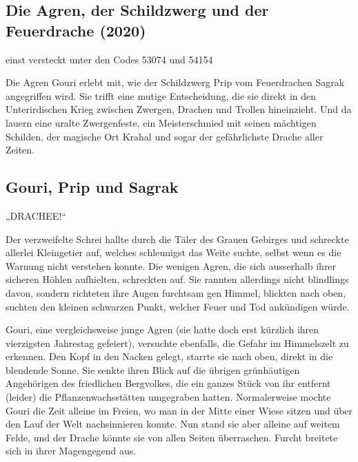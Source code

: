 \begin{chapterbox}
    \chapter{Die Agren, der Schildzwerg und der Feuerdrache (2020)}
    \label{Die Agren, der Schildzwerg und der Feuerdrache (2020)}

    \begin{center}
        einst versteckt unter den Codes 53074 und 54154
    \end{center}
    
    Die Agren Gouri erlebt mit, wie der Schildzwerg Prip vom Feuerdrachen Sagrak angegriffen wird. Sie trifft eine mutige Entscheidung, die sie direkt in den Unterirdischen Krieg zwischen Zwergen, Drachen und Trollen hineinzieht. Und da lauern eine uralte Zwergenfeste, ein Meisterschmied mit seinen mächtigen Schilden, der magische Ort Krahal und sogar der gefährlichste Drache aller Zeiten.
\end{chapterbox}

\section{Gouri, Prip und Sagrak}


„DRACHEE!“

Der verzweifelte Schrei hallte durch die Täler des Grauen Gebirges und schreckte allerlei Kleingetier auf, welches schleunigst das Weite suchte, selbst wenn es die Warnung nicht verstehen konnte. Die wenigen Agren, die sich ausserhalb ihrer sicheren Höhlen aufhielten, schreckten auf. Sie rannten allerdings nicht blindlings davon, sondern richteten ihre Augen furchtsam gen Himmel, blickten nach oben, suchten den kleinen schwarzen Punkt, welcher Feuer und Tod ankündigen würde.

Gouri, eine vergleichsweise junge Agren (sie hatte doch erst kürzlich ihren vierzigsten Jahrestag gefeiert), versuchte ebenfalls, die Gefahr im Himmelszelt zu erkennen. Den Kopf in den Nacken gelegt, starrte sie nach oben, direkt in die blendende Sonne. Sie senkte ihren Blick auf die übrigen grünhäutigen Angehörigen des friedlichen Bergvolkes, die ein ganzes Stück von ihr entfernt (leider) die Pflanzenwachsstätten umgegraben hatten. Normalerweise mochte Gouri die Zeit alleine im Freien, wo man in der Mitte einer Wiese sitzen und über den Lauf der Welt nachsinnieren konnte. Nun stand sie aber alleine auf weitem Felde, und der Drache könnte sie von allen Seiten überraschen. Furcht breitete sich in ihrer Magengegend aus.

